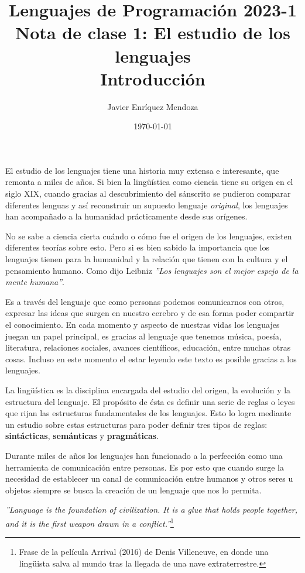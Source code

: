 \documentclass[12pt]{extarticle}
\title{\LARGE
Lenguajes de Programación 2023-1\\ 
Nota de clase 1: El estudio de los lenguajes\\
\color{Orchid} Introducción}
\author{Javier Enríquez Mendoza}
\date{\today}
\begin{document}
\maketitle


El estudio de los lenguajes tiene una historia muy extensa e interesante, que remonta a miles de años. Si bien la lingüística como ciencia tiene su origen en el siglo XIX, cuando gracias al descubrimiento del sánscrito se pudieron comparar diferentes lenguas y así reconstruir un supuesto lenguaje {\it original}, los lenguajes han acompañado a la humanidad prácticamente desde sus orígenes. 

No se sabe a ciencia cierta cuándo o cómo fue el origen de los lenguajes, existen diferentes teorías sobre esto. Pero si es bien sabido la importancia que los lenguajes tienen para la humanidad y la relación que tienen con la cultura y el pensamiento humano. Como dijo Leibniz {\it ''Los lenguajes son el mejor espejo de la mente humana''}.

Es a través del lenguaje que como personas podemos comunicarnos con otros, expresar las ideas que surgen en nuestro cerebro y de esa forma poder compartir el conocimiento. En cada momento y aspecto de nuestras vidas los lenguajes juegan un papel principal, es gracias al lenguaje que tenemos música, poesía, literatura, relaciones sociales, avances científicos, educación, entre muchas otras cosas. Incluso en este momento el estar leyendo este texto es posible gracias a los lenguajes.

La lingüística es la disciplina encargada del estudio del origen, la evolución y la estructura del lenguaje. El propósito de ésta es definir una serie de reglas o leyes que rijan las estructuras fundamentales de los lenguajes. Esto lo logra mediante un estudio sobre estas estructuras para poder definir tres tipos de reglas: {\bf sintácticas}, {\bf semánticas} y {\bf pragmáticas}.

Durante miles de años los lenguajes han funcionado a la perfección como una herramienta de comunicación entre personas. Es por esto que cuando surge la necesidad de establecer un canal de comunicación entre humanos y otros seres u objetos siempre se busca la creación de un lenguaje que nos lo permita.

\begin{displayquote}
{\it ''Language is the foundation of civilization. It is a glue that holds people together, and it is the first weapon drawn in a conflict.''}\footnote{Frase de la película Arrival (2016) de Denis Villeneuve, en donde una lingüista salva al mundo tras la llegada de una nave extraterrestre.}
\end{displayquote}
\end{document}
